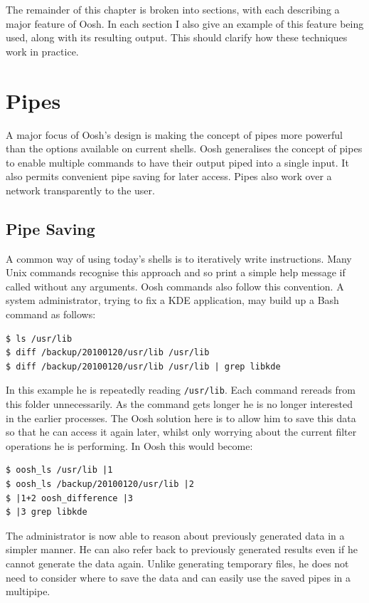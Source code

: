 \documentclass[12pt,twoside,notitlepage]{report}
\begin{document}
The remainder of this chapter is broken into sections, with each
describing a major feature of Oosh. In each section I also give an example
of this feature being used, along with its resulting output. This
should clarify how these techniques work in practice.

\section{Pipes}
A major focus of Oosh's design is making the concept of pipes more powerful than
the options available on current shells. Oosh generalises the concept of pipes
to enable multiple commands to have their output piped into a single input. It
also permits convenient pipe saving for later access. Pipes also work over a
network transparently to the user.

\subsection{Pipe Saving}
A common way of using today's shells is to iteratively write
instructions. Many Unix commands recognise this approach and so print
a simple help message if called without any arguments. Oosh commands
also follow this convention. A system
administrator, trying to fix a KDE application, may build up a Bash
command as follows:

\begin{verbatim}
$ ls /usr/lib
$ diff /backup/20100120/usr/lib /usr/lib
$ diff /backup/20100120/usr/lib /usr/lib | grep libkde
\end{verbatim}

In this example he is repeatedly reading {\tt /usr/lib}. Each command
rereads from this folder unnecessarily. As the command gets longer he
is no longer interested in the earlier processes. The Oosh solution
here is to allow him to save this data so that he can access it again
later, whilst only worrying about the current filter operations he is
performing. In Oosh this would become:

\begin{verbatim}
$ oosh_ls /usr/lib |1
$ oosh_ls /backup/20100120/usr/lib |2
$ |1+2 oosh_difference |3
$ |3 grep libkde
\end{verbatim}

The administrator is now able to reason about previously generated data in a
simpler manner. He can also refer back to previously generated results
even if he cannot generate the data again. Unlike generating temporary
files, he does not need to consider where to save the data and can
easily use the saved pipes in a multipipe.
\end{document}
